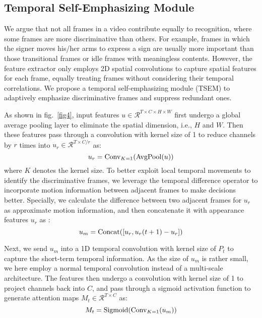 \documentclass[letterpaper]{article} \usepackage{aaai23}  \usepackage{times}  \usepackage{helvet}  \usepackage{courier}  \usepackage[hyphens]{url}  \usepackage{graphicx} \urlstyle{rm} \def\UrlFont{\rm}  \usepackage{natbib}  \usepackage{caption} \frenchspacing  \setlength{\pdfpagewidth}{8.5in} \setlength{\pdfpageheight}{11in} \usepackage{algorithm}
\begin{document}
\subsection{Temporal Self-Emphasizing Module}
We argue that not all frames in a video contribute equally to recognition, where some frames are more discriminative than others. For example, frames in which the signer moves his/her arms to express a sign are usually more important than those transitional frames or idle frames with meaningless contents. However, the feature extractor only employs 2D spatial convolutions to capture spatial features for each frame, equally treating frames without considering their temporal correlations. We propose a temporal self-emphasizing module (TSEM) to adaptively emphasize discriminative frames and suppress redundant ones. 

As shown in fig.~\ref{fig4}, input features $u \in \mathcal{R}^{T \times C\times H \times W}$ first undergo a global average pooling layer to eliminate the spatial dimension, i.e., $H$ and $W$. Then these features pass through a convolution with kernel size of 1 to reduce channels by $r$ times into $u_r \in \mathcal{R}^{T \times C/r}$ as:
\begin{equation}
  \label{e4}
  u_r = {\rm Conv}_{K=1}({\rm AvgPool}(u))
  \end{equation}
where $K$ denotes the kernel size. To better exploit local temporal movements to identify the discriminative frames, we leverage the temporal difference operator to incorporate motion information between adjacent frames to make decisions better. Specially, we calculate the difference between two adjacent frames for $u_r$ as approximate motion information, and then concatenate it with appearance features $u_r$ as : \begin{equation}
\label{e5}
u_m = {\rm Concat}([u_r, u_r(t+1)-u_r])
\end{equation}

Next, we send $u_m$ into a 1D temporal convolution with kernel size of $P_t$ to capture the short-term temporal information. As the size of $u_m$ is rather small, we here employ a normal temporal convolution instead of a multi-scale architecture. The features then undergo a convolution with kernel size of 1 to project channels back into $C$, and pass through a sigmoid activation function to generate attention maps $M_t \in \mathcal{R}^{T \times C}$ as:
\begin{equation}
  \label{e5}
  M_t = {\rm Sigmoid}({\rm Conv}_{K=1}(u_m))
  \end{equation}
\end{document}
